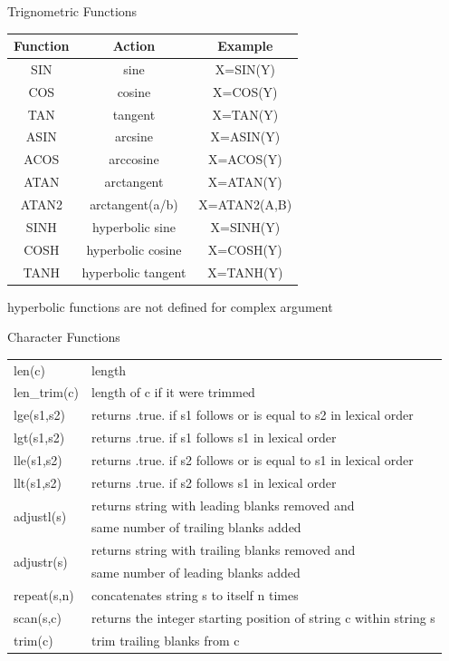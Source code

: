 \documentclass[c,mathserif,compress,xcolor=svgnames]{beamer}
\begin{document}
\begin{frame}{Trignometric Functions}
  \footnotesize
  \begin{center}
    \begin{tabular}{ccc}
      Function & Action & Example \\
      \hline
      SIN & sine & X=SIN(Y) \\
      COS & cosine & X=COS(Y) \\
      TAN & tangent & X=TAN(Y) \\
      ASIN & arcsine & X=ASIN(Y) \\
      ACOS & arccosine & X=ACOS(Y) \\
      ATAN & arctangent & X=ATAN(Y) \\
      ATAN2 & arctangent(a/b) & X=ATAN2(A,B) \\
      SINH & hyperbolic sine & X=SINH(Y) \\
      COSH & hyperbolic cosine & X=COSH(Y) \\
      TANH & hyperbolic tangent & X=TANH(Y) \\
      \hline
    \end{tabular}  
  
        {\tiny hyperbolic functions are not defined for complex argument}
  \end{center}
\end{frame}

\begin{frame}{Character Functions}
  \footnotesize
  \begin{center}
    \begin{tabular}{ll}
      \hline
      len(c) & length \\
      len\_trim(c) & length of c if it were trimmed \\
      lge(s1,s2) & returns .true. if s1 follows or is equal to s2 in lexical order \\
      lgt(s1,s2) & returns .true. if s1 follows s1 in lexical order \\
      lle(s1,s2) & returns .true. if s2 follows or is equal to s1 in lexical order \\
      llt(s1,s2) & returns .true. if s2 follows s1 in lexical order \\
      \multirow{2}{*}{adjustl(s)} & returns string with leading blanks removed and \\
      &   \quad same number of trailing blanks added \\
      \multirow{2}{*}{adjustr(s)} & returns string with trailing blanks removed and \\
      & \quad same number of leading blanks added \\
      repeat(s,n) & concatenates string s to itself n times \\
      scan(s,c) & returns the integer starting position of string c within string s \\
      trim(c) & trim trailing blanks from c \\
      \hline
    \end{tabular}
  \end{center}
\end{frame}
\end{document}
